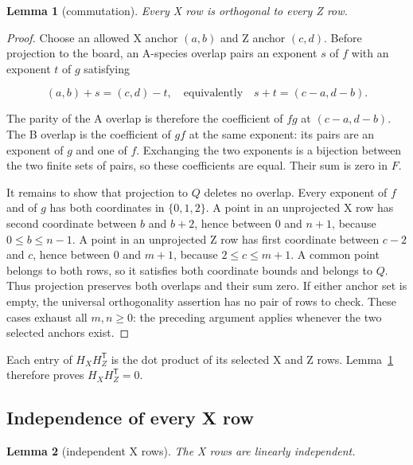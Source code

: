 \documentclass{article}
\newtheorem{lemma}{Lemma}
\begin{document}
\begin{lemma}[commutation]\label{lem:commute}
Every X row is orthogonal to every Z row.
\end{lemma}

\begin{proof}
Choose an allowed X anchor \((a,b)\) and Z anchor
\((c,d)\). Before projection to the board, an A-species overlap pairs an
exponent \(s\) of \(f\) with an exponent \(t\) of \(g\) satisfying

\begin{equation}
 (a,b)+s=(c,d)-t,
 \quad\text{equivalently}\quad s+t=(c-a,d-b).
\end{equation}

The parity of the A overlap is therefore the coefficient of \(fg\) at
\((c-a,d-b)\). The B overlap is the coefficient of \(gf\) at the same
exponent: its pairs are an exponent of \(g\) and one of \(f\).
Exchanging the two exponents is a bijection between the two finite sets
of pairs, so these coefficients are equal. Their sum is zero in \(F\).

It remains to show that projection to \(Q\) deletes no overlap. Every
exponent of \(f\) and of \(g\) has both coordinates in \(\{0,1,2\}\). A
point in an unprojected X row has second coordinate between \(b\) and
\(b+2\), hence between \(0\) and \(n+1\), because \(0\le b\le n-1\). A
point in an unprojected Z row has first coordinate between \(c-2\) and
\(c\), hence between \(0\) and \(m+1\), because \(2\le c\le m+1\). A
common point belongs to both rows, so it satisfies both coordinate
bounds and belongs to \(Q\). Thus projection preserves both overlaps and
their sum zero. If either anchor set is empty, the universal
orthogonality assertion has no pair of rows to check. These cases
exhaust all \(m,n\ge 0\): the preceding argument applies whenever the
two selected anchors exist.
\end{proof}

Each entry of \(H_XH_Z^{\mathsf T}\) is the dot product of its selected
X and Z rows. Lemma~\ref{lem:commute} therefore proves \(H_XH_Z^{\mathsf T}=0\).

\subsection{Independence of every X
row}\label{independence-of-every-x-row}

\begin{lemma}[independent X rows]\label{lem:x-independent}
The X rows are linearly independent.
\end{lemma}
\end{document}
